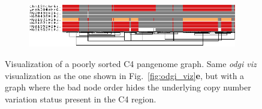 \begin{figure}[ht!]
	\begin{subfigure}{\linewidth}
		\centering
		\includegraphics[width=1.0\linewidth, trim=-0cm 2cm 0 0cm]{fig/sorting/chr6_pan_fa_a2fb268_4030258_6a1ecc2_smooth_C4_bad_sorted}
		\label{fig:bad-sorting}
	\end{subfigure}
	\caption{
		Visualization of a poorly sorted C4 pangenome graph.
		Same \textit{odgi viz} visualization as the one shown in Fig.~\ref{fig:odgi_viz}\textbf{e}, but with a graph where the bad node order hides the underlying copy number variation status present in the C4 region.
	}
	\label{fig:sorting}
\end{figure}
